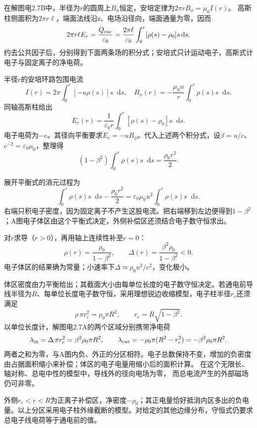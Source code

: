 \documentclass[UTF8,fontset=fandol,a4paper,11pt]{ctexart}
\newcommand{\dd}{\mathop{}\!\mathrm{d}}
\newcommand{\result}[1]{\begin{equation*}\boxed{#1}\end{equation*}}
\begin{document}
在解图电2.7B中，半径为$r$的圆周上$B_\phi$恒定，安培定律为$2\pi rB_\phi=\mu_0I(r)$。
高斯柱侧面积为$2\pi r\ell$，端面法线沿z、电场沿径向，端面通量为零，因而
\[
2\pi r\ell E_r=\frac{Q_{\rm enc}}{\varepsilon_0}
=\frac{2\pi\ell}{\varepsilon_0}\int_0^r[\rho(s)-\rho_0]s\,\mathrm ds.
\]
约去公共因子后，分别得到下面两条场的积分式；安培式只计运动电子，高斯式计电子与固定离子的净电荷。


半径$r$的安培环路包围电流
\[
 I(r)=2\pi\int_0^r[-u\rho(s)]s\dd s,
 \quad B_\phi(r)=-\frac{\mu_0u}{r}\int_0^r\rho(s)s\dd s.
\]
同轴高斯柱给出
\[
 E_r(r)=\frac1{\varepsilon_0r}\int_0^r[\rho(s)-\rho_0]s\dd s.
\]
电子电荷为$-e$。其径向平衡要求$E_r=-uB_\phi$。代入上述两个积分式，设$\beta=u/c$、$c^{-2}=\varepsilon_0\mu_0$，整理得
\[
 (1-\beta^2)\int_0^r\rho(s)s\dd s=\frac{\rho_0r^2}{2}.
\]

展开平衡式的消元过程为
\[
\int_0^r\rho(s)s\dd s-\frac{\rho_0r^2}{2}
=\varepsilon_0\mu_0u^2\int_0^r\rho(s)s\dd s .
\]
右端只积电子密度，因为固定离子不产生这股电流。把右端移到左边便得到$1-\beta^2$；A图电子体区由这个平衡式决定，外侧补偿区还须结合电子数守恒求出。

对$r$求导（$r>0$），再用轴上连续性补至$r=0$：
\result{\rho(r)=\frac{\rho_0}{1-\beta^2},\qquad
 \Delta(r)=\frac{\beta^2\rho_0}{1-\beta^2}<0.}
电子体区的结果确为常量；小速率下$\Delta\simeq\rho_0u^2/c^2$，变化极小。

体区密度由力平衡给出；其截面大小由每单位长度的电子数守恒决定。若通电前导线半径为$R$、每单位长度电子数守恒，采用理想锐边收缩模型，电子柱半径$r_e$还须满足
\[
 \rho\,\pi r_e^2=\rho_0\pi R^2,
 \qquad r_e=R\sqrt{1-\beta^2}.
\]
以单位长度计，解图电2.7A的两个区域分别携带净电荷
\[
\lambda_{\rm in}=\Delta\,\pi r_e^2
=\beta^2\rho_0\pi R^2,\qquad
\lambda_{\rm out}=-\rho_0\pi(R^2-r_e^2)
=-\beta^2\rho_0\pi R^2.
\]
两者之和为零，与A图内负、外正的分区相符。电子总数保持不变，增加的负密度由占据面积缩小来补偿；体区的电子电量用缩小后的面积计算。
在这个无限长、轴对称、总电中性的模型中，导线外的径向电场为零，
而总电流产生的外部磁场仍可非零。

外侧$r_e<r<R$为正离子补偿区，净密度$-\rho_0$；其正电量恰好抵消内区多出的负电量。以上分区采用电子柱外缘截断的模型。对给定的其他边缘分布，守恒式仍要求总电子线电荷等于通电前的值。
\end{document}
